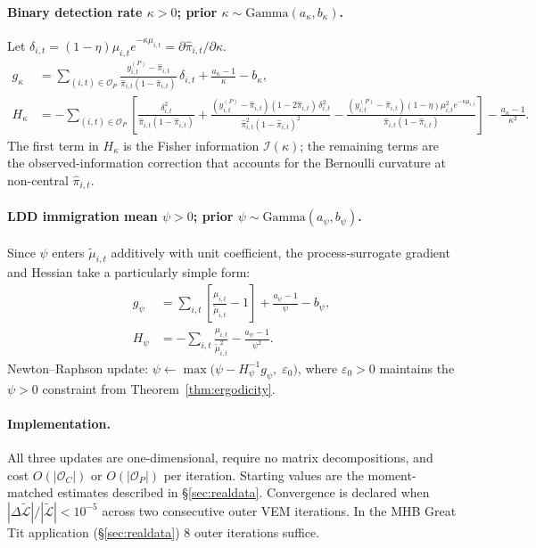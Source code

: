 \documentclass[review,12pt]{elsarticle}
\theoremstyle{definition}
\begin{document}
\paragraph{Binary detection rate $\kappa>0$; prior $\kappa\sim\mathrm{Gamma}(a_\kappa,b_\kappa)$.}
Let $\delta_{i,t}=(1-\eta)\mu_{i,t}e^{-\kappa\mu_{i,t}}=\partial\hat\pi_{i,t}/\partial\kappa$.
\begin{align}
g_\kappa &= \sum_{(i,t)\in\mathcal{O}_P}
  \frac{y^{(P)}_{i,t}-\hat\pi_{i,t}}{\hat\pi_{i,t}(1-\hat\pi_{i,t})}\,\delta_{i,t}
  + \frac{a_\kappa-1}{\kappa} - b_\kappa, \label{eq:grad-kappa}\\
H_\kappa &= -\sum_{(i,t)\in\mathcal{O}_P}
  \left[\frac{\delta_{i,t}^2}{\hat\pi_{i,t}(1-\hat\pi_{i,t})}
    + \frac{(y^{(P)}_{i,t}-\hat\pi_{i,t})(1-2\hat\pi_{i,t})\,\delta_{i,t}^2}
           {\hat\pi_{i,t}^2(1-\hat\pi_{i,t})^2}
    - \frac{(y^{(P)}_{i,t}-\hat\pi_{i,t})(1-\eta)\mu_{i,t}^2 e^{-\kappa\mu_{i,t}}}
           {\hat\pi_{i,t}(1-\hat\pi_{i,t})}\right]
  - \frac{a_\kappa-1}{\kappa^2}. \label{eq:hess-kappa}
\end{align}
The first term in $H_\kappa$ is the Fisher information $\mathcal{I}(\kappa)$;
the remaining terms are the observed-information correction that accounts for
the Bernoulli curvature at non-central $\hat\pi_{i,t}$.

\paragraph{LDD immigration mean $\psi>0$; prior $\psi\sim\mathrm{Gamma}(a_\psi,b_\psi)$.}
Since $\psi$ enters $\tilde\mu_{i,t}$ additively with unit coefficient,
the process-surrogate gradient and Hessian take a particularly simple form:
\begin{align}
g_\psi &= \sum_{i,t}\left[\frac{\mu_{i,t}}{\tilde\mu_{i,t}}-1\right]
  + \frac{a_\psi-1}{\psi} - b_\psi, \label{eq:grad-psi}\\
H_\psi &= -\sum_{i,t}\frac{\mu_{i,t}}{\tilde\mu_{i,t}^2}
  - \frac{a_\psi-1}{\psi^2}. \label{eq:hess-psi}
\end{align}
Newton--Raphson update: $\psi\leftarrow\max\bigl(\psi - H_\psi^{-1}g_\psi,\;\varepsilon_0\bigr)$,
where $\varepsilon_0>0$ maintains the $\psi>0$ constraint from Theorem~\ref{thm:ergodicity}.

\paragraph{Implementation.}
All three updates are one-dimensional, require no matrix decompositions, and
cost $O(|\mathcal{O}_C|)$ or $O(|\mathcal{O}_P|)$ per iteration.
Starting values are the moment-matched estimates described in
\S\ref{sec:realdata}.  Convergence is declared when
$|\Delta\tilde{\mathcal{L}}|/|\tilde{\mathcal{L}}|<10^{-5}$ across two
consecutive outer VEM iterations.  In the MHB Great Tit application
(\S\ref{sec:realdata}) 8 outer iterations suffice.
\end{document}
